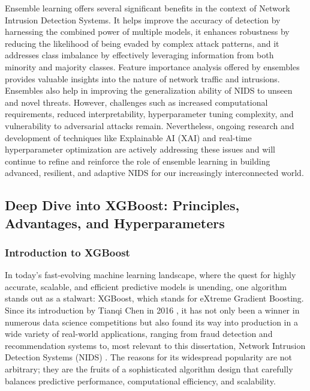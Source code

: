 Ensemble learning offers several significant benefits in the context of Network Intrusion Detection Systems. It helps improve the accuracy of detection by harnessing the combined power of multiple models, it enhances robustness by reducing the likelihood of being evaded by complex attack patterns, and it addresses class imbalance by effectively leveraging information from both minority and majority classes. Feature importance analysis offered by ensembles provides valuable insights into the nature of network traffic and intrusions. Ensembles also help in improving the generalization ability of NIDS to unseen and novel threats. However, challenges such as increased computational requirements, reduced interpretability, hyperparameter tuning complexity, and vulnerability to adversarial attacks remain. Nevertheless, ongoing research and development of techniques like Explainable AI (XAI) and real-time hyperparameter optimization are actively addressing these issues and will continue to refine and reinforce the role of ensemble learning in building advanced, resilient, and adaptive NIDS for our increasingly interconnected world.



\subsection{Deep Dive into XGBoost: Principles, Advantages, and Hyperparameters}

\subsubsection{Introduction to XGBoost} 
In today's fast-evolving machine learning landscape, where the quest for highly accurate, scalable, and efficient predictive models is unending, one algorithm stands out as a stalwart: XGBoost, which stands for eXtreme Gradient Boosting. Since its introduction by Tianqi Chen in 2016 \parencite{chen2016xgboost}, it has not only been a winner in numerous data science competitions but also found its way into production in a wide variety of real-world applications, ranging from fraud detection and recommendation systems to, most relevant to this dissertation, Network Intrusion Detection Systems (NIDS) \parencite{almutairi2025intrusion, habeeb2024two}. The reasons for its widespread popularity are not arbitrary; they are the fruits of a sophisticated algorithm design that carefully balances predictive performance, computational efficiency, and scalability.

